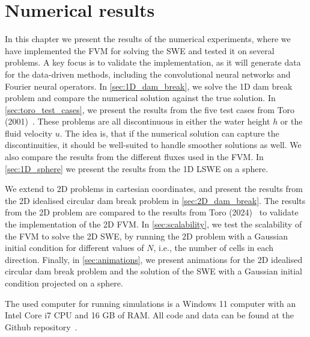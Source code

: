 \chapter{Numerical results}\label{ch:numerical_results}
In this chapter we present the results of the numerical experiments, where we have implemented the FVM for solving the SWE and tested it on several problems.
A key focus is to validate the implementation, as it will generate data for the data-driven methods, including the convolutional neural networks and Fourier neural operators.
In \autoref{sec:1D_dam_break}, we solve the 1D dam break problem and compare the numerical solution against the true solution.
In \autoref{sec:toro_test_cases}, we present the results from the five test cases from Toro (2001)~\cite{Toro2001-Shock}.
These problems are all discontinuous in either the water height $h$ or the fluid velocity $u$.
The idea is, that if the numerical solution can capture the discontinuities, it should be well-suited to handle smoother solutions as well.
We also compare the results from the different fluxes used in the FVM.
In \autoref{sec:1D_sphere} we present the results from the 1D LSWE on a sphere.

We extend to 2D problems in cartesian coordinates, and present the results from the 2D idealised circular dam break problem in \autoref{sec:2D_dam_break}.
The results from the 2D problem are compared to the results from Toro (2024)~\cite{Toro2024} to validate the implementation of the 2D FVM.
In \autoref{sec:scalability}, we test the scalability of the FVM to solve the 2D SWE, by running the 2D problem with a Gaussian initial condition for different values of $N$, i.e., the number of cells in each direction.
Finally, in \autoref{sec:animations}, we present animations for the 2D idealised circular dam break problem and the solution of the SWE with a Gaussian initial condition projected on a sphere.

The used computer for running simulations is a Windows 11 computer with an Intel Core i7 CPU and 16 GB of RAM.
All code and data can be found at the Github repository~\cite{Github_SWE}.

